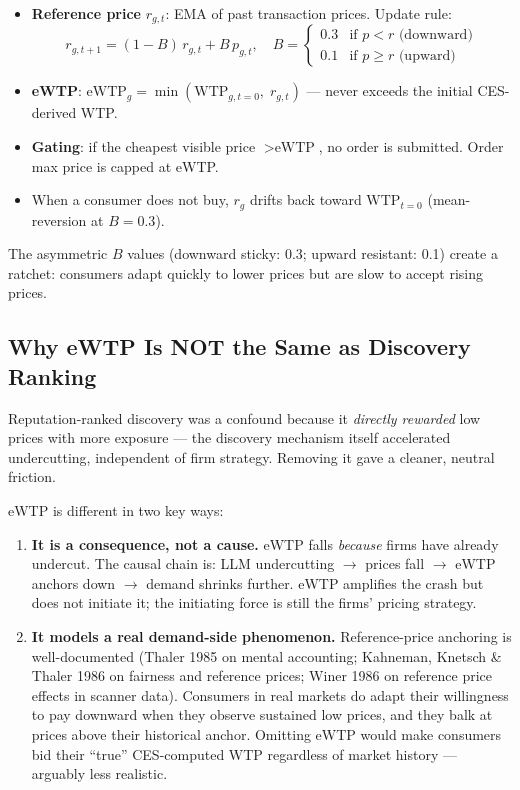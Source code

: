 \documentclass{article}
\begin{document}
\begin{itemize}
  \item \textbf{Reference price} $r_{g,t}$: EMA of past transaction prices. Update rule:
    \[
      r_{g,t+1} = (1-B)\,r_{g,t} + B\,p_{g,t}, \quad
      B = \begin{cases} 0.3 & \text{if } p < r \text{ (downward)} \\ 0.1 & \text{if } p \geq r \text{ (upward)} \end{cases}
    \]
  \item \textbf{eWTP}: $\text{eWTP}_g = \min(\text{WTP}_{g,t=0},\; r_{g,t})$ — never exceeds the initial CES-derived WTP.
  \item \textbf{Gating}: if the cheapest visible price $> \text{eWTP}$, no order is submitted. Order max price is capped at eWTP.
  \item When a consumer does not buy, $r_g$ drifts back toward $\text{WTP}_{t=0}$ (mean-reversion at $B=0.3$).
\end{itemize}

The asymmetric $B$ values (downward sticky: 0.3; upward resistant: 0.1) create a ratchet: consumers adapt quickly to lower prices but are slow to accept rising prices.

\subsection{Why eWTP Is NOT the Same as Discovery Ranking}

Reputation-ranked discovery was a confound because it \emph{directly rewarded} low prices with more exposure — the discovery mechanism itself accelerated undercutting, independent of firm strategy. Removing it gave a cleaner, neutral friction.

eWTP is different in two key ways:

\begin{enumerate}
  \item \textbf{It is a consequence, not a cause.} eWTP falls \emph{because} firms have already undercut. The causal chain is: LLM undercutting $\to$ prices fall $\to$ eWTP anchors down $\to$ demand shrinks further. eWTP amplifies the crash but does not initiate it; the initiating force is still the firms' pricing strategy.

  \item \textbf{It models a real demand-side phenomenon.} Reference-price anchoring is well-documented (Thaler 1985 on mental accounting; Kahneman, Knetsch \& Thaler 1986 on fairness and reference prices; Winer 1986 on reference price effects in scanner data). Consumers in real markets do adapt their willingness to pay downward when they observe sustained low prices, and they balk at prices above their historical anchor. Omitting eWTP would make consumers bid their ``true'' CES-computed WTP regardless of market history — arguably less realistic.
\end{enumerate}
\end{document}
